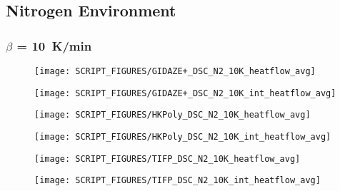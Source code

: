 \begin{landscape}
\subsection{Nitrogen Environment}
\label{DSC_N2}
\subsubsection{$\beta$ = 10~K/min}
\begin{minipage}{0.65\textwidth}
\begin{figure}[H]
{\texttt{[image: SCRIPT\_FIGURES/GIDAZE+\_DSC\_N2\_10K\_heatflow\_avg]}}\\
\end{figure}
\end{minipage}
\begin{minipage}{0.35\textwidth}
\begin{figure}[H]
{\texttt{[image: SCRIPT\_FIGURES/GIDAZE+\_DSC\_N2\_10K\_int\_heatflow\_avg]}}\\
\end{figure}
\end{minipage}


\begin{minipage}{0.65\textwidth}
\begin{figure}[H]
{\texttt{[image: SCRIPT\_FIGURES/HKPoly\_DSC\_N2\_10K\_heatflow\_avg]}}\\
\end{figure}
\end{minipage}
\begin{minipage}{0.35\textwidth}
\begin{figure}[H]
{\texttt{[image: SCRIPT\_FIGURES/HKPoly\_DSC\_N2\_10K\_int\_heatflow\_avg]}}\\
\end{figure}
\end{minipage}

\begin{minipage}{0.65\textwidth}
\begin{figure}[H]
{\texttt{[image: SCRIPT\_FIGURES/TIFP\_DSC\_N2\_10K\_heatflow\_avg]}}\\
\end{figure}
\end{minipage}
\begin{minipage}{0.35\textwidth}
\begin{figure}[H]
{\texttt{[image: SCRIPT\_FIGURES/TIFP\_DSC\_N2\_10K\_int\_heatflow\_avg]}}\\
\end{figure}
\end{minipage}
\vfill


\end{landscape}
